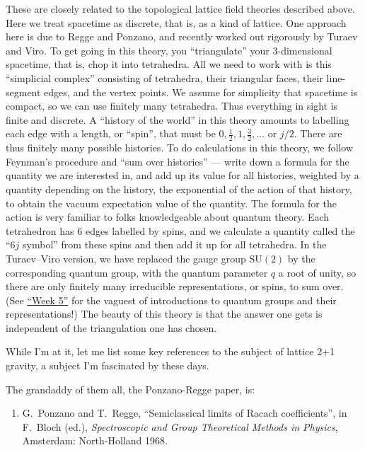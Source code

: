 \documentclass{article}
\def\tightlist{}
\begin{document}
These are closely related to the topological lattice field theories
described above. Here we treat spacetime as discrete, that is, as a kind
of lattice. One approach here is due to Regge and Ponzano, and recently
worked out rigorously by Turaev and Viro. To get going in this theory,
you ``triangulate'' your \(3\)-dimensional spacetime, that is, chop it
into tetrahedra. All we need to work with is this ``simplicial complex''
consisting of tetrahedra, their triangular faces, their line-segment
edges, and the vertex points. We assume for simplicity that spacetime is
compact, so we can use finitely many tetrahedra. Thus everything in
sight is finite and discrete. A ``history of the world'' in this theory
amounts to labelling each edge with a length, or ``spin'', that must be
\(0,\frac{1}{2},1,\frac{3}{2},\ldots\) or \(j/2\). There are thus finitely many possible
histories. To do calculations in this theory, we follow Feynman's
procedure and ``sum over histories'' --- write down a formula for the
quantity we are interested in, and add up its value for all histories,
weighted by a quantity depending on the history, the exponential of the
action of that history, to obtain the vacuum expectation value of the
quantity. The formula for the action is very familiar to folks
knowledgeable about quantum theory. Each tetrahedron has 6 edges
labelled by spins, and we calculate a quantity called the ``\(6j\)
symbol'' from these spins and then add it up for all tetrahedra. In the
Turaev--Viro version, we have replaced the gauge group \(\mathrm{SU}(2)\)
by the corresponding quantum group, with the quantum parameter \(q\) a
root of unity, so there are only finitely many irreducible
representations, or spins, to sum over. (See
\protect\hyperlink{week5}{``Week 5''} for the vaguest of introductions
to quantum groups and their representations!) The beauty of this theory
is that the answer one gets is independent of the triangulation one has
chosen.

While I'm at it, let me list some key references to the subject of
lattice 2+1 gravity, a subject I'm fascinated by these days.

The grandaddy of them all, the Ponzano-Regge paper, is:

\begin{enumerate}
\def\labelenumi{\arabic{enumi})}
\setcounter{enumi}{5}
\tightlist
\item
  G.\ Ponzano and T.\ Regge, ``Semiclassical limits of Racach coefficients'', 
  in F.\ Bloch (ed.), \emph{Spectroscopic and
  Group Theoretical Methods in Physics}, Amsterdam: North-Holland 1968.
\end{enumerate}
\end{document}

